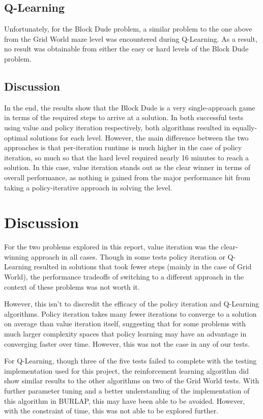 \documentclass{article}
\begin{document}
    \subsection{Q-Learning}
      Unfortunately, for the Block Dude problem, a similar problem to the one above from the Grid World maze level was encountered during Q-Learning. As a result, no result was obtainable from either the easy or hard levels of the Block Dude problem.

    \subsection{Discussion}
      In the end, the results show that the Block Dude is a very single-approach game in terms of the required steps to arrive at a solution. In both successful tests using value and policy iteration respectively, both algorithms resulted in equally-optimal solutions for each level. However, the main difference between the two approaches is that per-iteration runtime is much higher in the case of policy iteration, so much so that the hard level required nearly 16 minutes to reach a solution. In this case, value iteration stands out as the clear winner in terms of overall performance, as nothing is gained from the major performance hit from taking a policy-iterative approach in solving the level.

  \section{Discussion}
    For the two problems explored in this report, value iteration was the clear-winning approach in all cases. Though in some tests policy iteration or Q-Learning resulted in solutions that took fewer steps (mainly in the case of Grid World), the performance tradeoffs of switching to a different approach in the context of these problems was not worth it.

    However, this isn't to discredit the efficacy of the policy iteration and Q-Learning algorithms. Policy iteration takes many fewer iterations to converge to a solution on average than value iteration itself, suggesting that for some problems with much larger complexity spaces that policy learning may have an advantage in converging faster over time. However, this was not the case in any of our tests.

    For Q-Learning, though three of the five tests failed to complete with the testing implementation used for this project, the reinforcement learning algorithm did show similar results to the other algorithms on two of the Grid World tests. With further parameter tuning and a better understanding of the implementation of this algorithm in BURLAP, this may have been able to be avoided. However, with the constraint of time, this was not able to be explored further.
\end{document}
